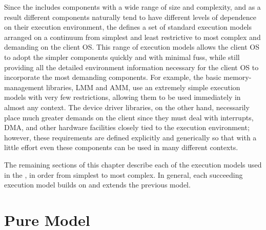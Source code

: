Since the \oskit{} includes components
with a wide range of size and complexity,
and as a result different components naturally tend to have
different levels of dependence on their execution environment,
the \oskit{} defines a set of standard execution models
arranged on a continuum from simplest and least restrictive
to most complex and demanding on the client OS\@.
This range of execution models allows the client OS
to adopt the simpler \oskit{} components quickly and with minimal fuss,
while still providing all the detailed environment information necessary
for the client OS to incorporate the most demanding components.
For example, the basic memory-management libraries,
LMM and AMM,
use an extremely simple execution models with very few restrictions,
allowing them to be used immediately in almost any context.
The device driver libraries, on the other hand,
necessarily place much greater demands on the client
since they must deal with interrupts, DMA,
and other hardware facilities closely tied to the execution environment;
however, these requirements are defined explicitly and generically
so that with a little effort even these components
can be used in many different contexts.

The remaining sections of this chapter
describe each of the execution models used in the \oskit{},
in order from simplest to most complex.
In general, each succeeding execution model
builds on and extends the previous model.

\section{Pure Model}
\label{pure-env}

